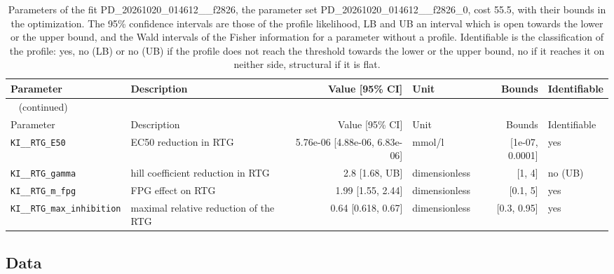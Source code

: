 \documentclass{article}
\begin{document}
\begin{longtable}{llrlrl}
\caption{Parameters of the fit PD\_20261020\_014612\_\_f2826, the parameter set PD\_20261020\_014612\_\_f2826\_0, cost 55.5, with their bounds in the optimization. The 95\% confidence intervals are those of the profile likelihood, LB and UB an interval which is open towards the lower or the upper bound, and the Wald intervals of the Fisher information for a parameter without a profile. Identifiable is the classification of the profile: yes, no (LB) or no (UB) if the profile does not reach the threshold towards the lower or the upper bound, no if it reaches it on neither side, structural if it is flat.}\label{tab:parameters:PD_20261020_014612__f2826} \\
\toprule
Parameter & Description & Value [95\% CI] & Unit & Bounds & Identifiable \\
\midrule
\endfirsthead
\multicolumn{6}{l}{\small\tablename~\thetable{} (continued)} \\
\toprule
Parameter & Description & Value [95\% CI] & Unit & Bounds & Identifiable \\
\midrule
\endhead
\bottomrule
\endlastfoot
\texttt{KI\_\_RTG\_E50} & EC50 reduction in RTG & 5.76e-06 [4.88e-06, 6.83e-06] & mmol/l & [1e-07, 0.0001] & yes \\
\texttt{KI\_\_RTG\_gamma} & hill coefficient reduction in RTG & 2.8 [1.68, UB] & dimensionless & [1, 4] & no (UB) \\
\texttt{KI\_\_RTG\_m\_fpg} & FPG effect on RTG & 1.99 [1.55, 2.44] & dimensionless & [0.1, 5] & yes \\
\texttt{KI\_\_RTG\_max\_inhibition} & maximal relative reduction of the RTG & 0.64 [0.618, 0.67] & dimensionless & [0.3, 0.95] & yes \\
\end{longtable}

\subsection{Data}
\end{document}
